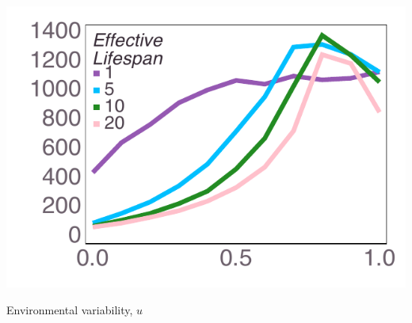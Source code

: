 \documentclass[varwidth=true,crop=false]{standalone}
\newcommand{\meanvar}[1]{\langle #1 \rangle}
\newcommand{\meansoc}{\meanvar{\pi_\mathrm{S}}}
\newcommand{\meanasoc}{\meanvar{\pi_\mathrm{A}}}
\begin{document}
	\begin{minipage}{3.75in}%
		  \includegraphics[width=\textwidth]{Figures/step_over_u_lowpayoff=0.8_nbehaviors=10.pdf}
		  \\[-2.75em]
	  \begin{center}
          {\hspace{3.25em} \huge Environmental variability, $u$}
      \end{center}
	\end{minipage}  
\end{document}
